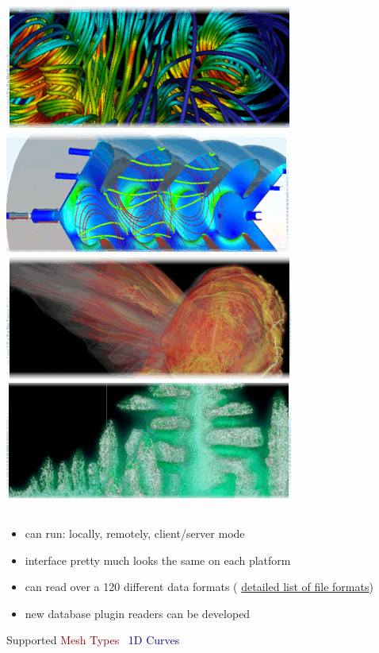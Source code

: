 \begin{frame}
\frametitle{\href{https://wci.llnl.gov/simulation/computer-codes/visit/}{\includegraphics[height=.85cm]{figs/visit-logos/VisIt-01}} \href{https://wci.llnl.gov/simulation/computer-codes/visit/}{\includegraphics[height=.875cm]{figs/visit-logos/VisIt-02}} \href{https://wci.llnl.gov/simulation/computer-codes/visit/}{\includegraphics[height=.875cm]{figs/visit-logos/VisIt-03}} \href{https://wci.llnl.gov/simulation/computer-codes/visit/}{\includegraphics[height=.875cm]{figs/visit-logos/VisIt-04}} \hspace{-8.5cm}{\bf \textcolor{white}{VisIt}}}

\begin{columns}
\begin{column}{5.5cm}
\begin{itemize}
        \item can run: locally, remotely, client/server mode
        \item interface pretty much looks the same on each platform
        \item can read over a 120 different data formats ( \href{http://www.visitusers.org/index.php?title=Detailed_list_of_file_formats_VisIt_supports}{\small detailed list of file formats})
        \item new database plugin readers can be developed
\end{itemize}
\pause
\begin{beamerboxesrounded}[upper=block head,lower=block body,shadow=true]{ Supported \textcolor{DarkRed}{Mesh Types} }
        ~\textcolor{DarkBlue}{1D Curves}


\end{beamerboxesrounded}
\end{column}
\end{columns}
\end{frame}
